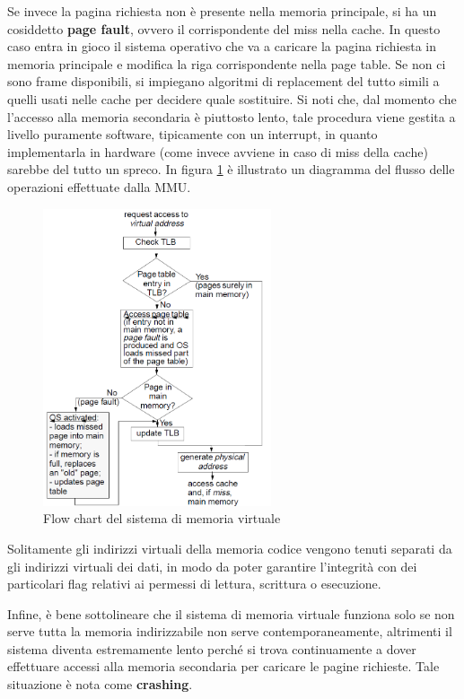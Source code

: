 \documentclass[11pt,4paper]{report}
\begin{document}
Se invece la pagina richiesta non è presente nella memoria principale, si ha un cosiddetto \textbf{page fault}, ovvero il corrispondente del miss nella cache. In questo caso entra in gioco il sistema operativo che va a caricare la pagina richiesta in memoria principale e modifica la riga corrispondente nella page table. Se non ci sono frame disponibili, si impiegano algoritmi di replacement del tutto simili a quelli usati nelle cache per decidere quale sostituire. Si noti che, dal momento che l'accesso alla memoria secondaria è piuttosto lento, tale procedura viene gestita a livello puramente software, tipicamente con un interrupt, in quanto implementarla in hardware (come invece avviene in caso di miss della cache) sarebbe del tutto un spreco.
In figura \ref{fig:vm_flow} è illustrato un diagramma del flusso delle operazioni effettuate dalla MMU.

\begin{figure}[hbtp]
	\centering
	\includegraphics[width=0.6\textwidth]{mem_sys/vm_flow}
	\caption{Flow chart del sistema di memoria virtuale}
	\label{fig:vm_flow}
\end{figure}

Solitamente gli indirizzi virtuali della memoria codice vengono tenuti separati da gli indirizzi virtuali dei dati, in modo da poter garantire l'integrità con dei particolari flag relativi ai permessi di lettura, scrittura o esecuzione.

Infine, è bene sottolineare che il sistema di memoria virtuale funziona solo se non serve tutta la memoria indirizzabile non serve contemporaneamente, altrimenti il sistema diventa estremamente lento perché si trova continuamente a dover effettuare accessi alla memoria secondaria per caricare le pagine richieste. Tale situazione è nota come \textbf{crashing}.
\end{document}
